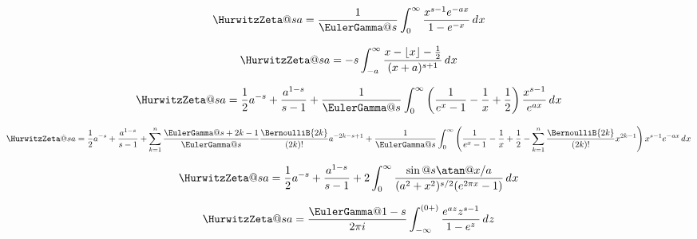 \documentclass{article}
\begin{document}

\begin{equation}\label{eq:ZE.HZE.INT1}%
  \HurwitzZeta@{s}{a}
  = \frac{1}{\EulerGamma@{s}}
    \int_0^\infty  \frac{x^{s-1} \expe^{-ax}}{1-\expe^{-x}} \diff{x}
\end{equation}

\begin{equation}\label{eq:ZE.HZE.INT2}%
  \HurwitzZeta@{s}{a}
  = -s \int_{-a}^\infty
           \frac{x-\floor{x}-\frac{1}{2}}{(x+a)^{s+1}}
       \diff{x}
\end{equation}

\begin{equation}\label{eq:ZE.HZE.INT3}%
  \HurwitzZeta@{s}{a}
  = \frac{1}{2} a^{-s}
  + \frac{a^{1-s}}{s-1}
  + \frac{1}{\EulerGamma@{s}}
    \int_0^\infty
        \left( \frac{1}{\expe^x-1} - \frac{1}{x}+ \frac{1}{2} \right)
        \frac{x^{s-1}}{\expe^{ax}}
    \diff{x}
\end{equation}

\begin{equation}\label{eq:ZE.HZE.INT4}%
  \HurwitzZeta@{s}{a}
  = \frac{1}{2} a^{-s}+ \frac{a^{1-s}}{s-1}
  + \sum_{k=1}^n
        \frac{\EulerGamma@{s+2k-1}}{\EulerGamma@{s}}
        \frac{\BernoulliB{2k}}{(2k)!}
        a^{-2k-s+1}
  + \frac{1}{\EulerGamma@{s}}
    \int_0^\infty
        \left( \frac{1}{\expe^x-1} - \frac{1}{x} + \frac{1}{2}
             - \sum_{k=1}^n \frac{\BernoulliB{2k}}{(2k)!} x^{2k-1}
        \right) x^{s-1} \expe^{-ax} \diff{x}
\end{equation}

\begin{equation}\label{eq:ZE.HZE.INT5}%
  \HurwitzZeta@{s}{a}
  = \frac{1}{2} a^{-s}
  + \frac{a^{1-s}}{s-1}
  + 2 \int_0^\infty
          \frac{\sin@{s \atan@{x/a}}}{(a^2+x^2)^{s/2} (\expe^{2 \cpi x}-1)}
      \diff{x}
\end{equation}

\begin{equation}\label{eq:ZE.HZE.INT6}%
  \HurwitzZeta@{s}{a}
  = \frac{\EulerGamma@{1-s}}{2 \cpi \iunit}
    \int_{-\infty}^{(0+)} \frac{\expe^{az} z^{s-1}}{1 - \expe^z} \diff{z}
\end{equation}
\end{document}
